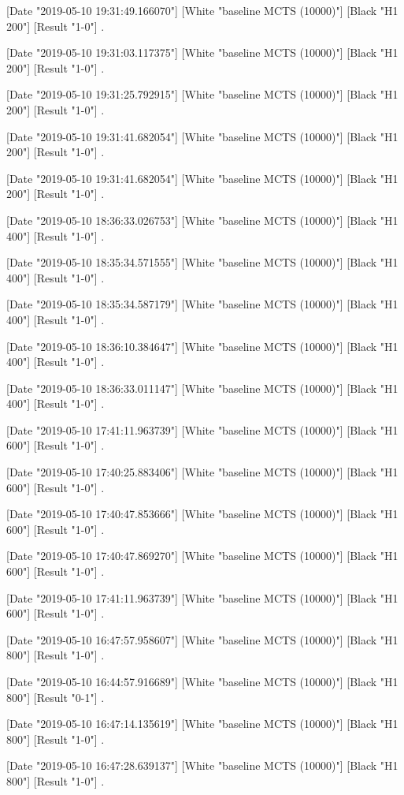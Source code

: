 {[Date "2019-05-10 19:31:49.166070"]
[White "baseline MCTS (10000)"]
[Black "H1 200"]
[Result "1-0"]
.

[Date "2019-05-10 19:31:03.117375"]
[White "baseline MCTS (10000)"]
[Black "H1 200"]
[Result "1-0"]
.

[Date "2019-05-10 19:31:25.792915"]
[White "baseline MCTS (10000)"]
[Black "H1 200"]
[Result "1-0"]
.

[Date "2019-05-10 19:31:41.682054"]
[White "baseline MCTS (10000)"]
[Black "H1 200"]
[Result "1-0"]
.

[Date "2019-05-10 19:31:41.682054"]
[White "baseline MCTS (10000)"]
[Black "H1 200"]
[Result "1-0"]
.

[Date "2019-05-10 18:36:33.026753"]
[White "baseline MCTS (10000)"]
[Black "H1 400"]
[Result "1-0"]
.

[Date "2019-05-10 18:35:34.571555"]
[White "baseline MCTS (10000)"]
[Black "H1 400"]
[Result "1-0"]
.

[Date "2019-05-10 18:35:34.587179"]
[White "baseline MCTS (10000)"]
[Black "H1 400"]
[Result "1-0"]
.

[Date "2019-05-10 18:36:10.384647"]
[White "baseline MCTS (10000)"]
[Black "H1 400"]
[Result "1-0"]
.

[Date "2019-05-10 18:36:33.011147"]
[White "baseline MCTS (10000)"]
[Black "H1 400"]
[Result "1-0"]
.

[Date "2019-05-10 17:41:11.963739"]
[White "baseline MCTS (10000)"]
[Black "H1 600"]
[Result "1-0"]
.

[Date "2019-05-10 17:40:25.883406"]
[White "baseline MCTS (10000)"]
[Black "H1 600"]
[Result "1-0"]
.

[Date "2019-05-10 17:40:47.853666"]
[White "baseline MCTS (10000)"]
[Black "H1 600"]
[Result "1-0"]
.

[Date "2019-05-10 17:40:47.869270"]
[White "baseline MCTS (10000)"]
[Black "H1 600"]
[Result "1-0"]
.

[Date "2019-05-10 17:41:11.963739"]
[White "baseline MCTS (10000)"]
[Black "H1 600"]
[Result "1-0"]
.

[Date "2019-05-10 16:47:57.958607"]
[White "baseline MCTS (10000)"]
[Black "H1 800"]
[Result "1-0"]
.

[Date "2019-05-10 16:44:57.916689"]
[White "baseline MCTS (10000)"]
[Black "H1 800"]
[Result "0-1"]
.

[Date "2019-05-10 16:47:14.135619"]
[White "baseline MCTS (10000)"]
[Black "H1 800"]
[Result "1-0"]
.

[Date "2019-05-10 16:47:28.639137"]
[White "baseline MCTS (10000)"]
[Black "H1 800"]
[Result "1-0"]
.

}
